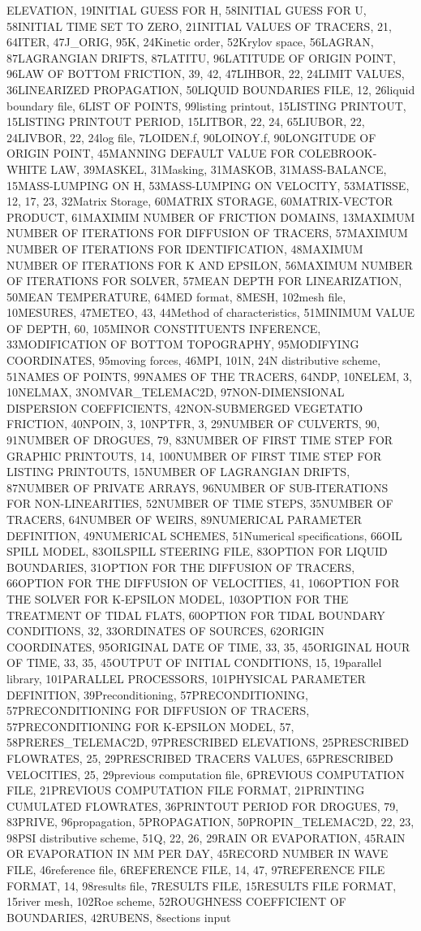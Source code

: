 ELEVATION, 19INITIAL GUESS FOR H, 58INITIAL GUESS FOR U, 58INITIAL TIME SET TO ZERO, 21INITIAL VALUES OF TRACERS, 21, 64ITER, 47J\_ORIG, 95K, 24Kinetic order, 52Krylov space, 56LAGRAN, 87LAGRANGIAN DRIFTS, 87LATITU, 96LATITUDE OF ORIGIN POINT, 96LAW OF BOTTOM FRICTION, 39, 42, 47LIHBOR, 22, 24LIMIT VALUES, 36LINEARIZED PROPAGATION, 50LIQUID BOUNDARIES FILE, 12, 26liquid boundary file, 6LIST OF POINTS, 99listing printout, 15LISTING PRINTOUT, 15LISTING PRINTOUT PERIOD, 15LITBOR, 22, 24, 65LIUBOR, 22, 24LIVBOR, 22, 24log file, 7LOIDEN.f, 90LOINOY.f, 90LONGITUDE OF ORIGIN POINT, 45MANNING DEFAULT VALUE FOR COLEBROOK-WHITE LAW, 39MASKEL, 31Masking, 31MASKOB, 31MASS-BALANCE, 15MASS-LUMPING ON H, 53MASS-LUMPING ON VELOCITY, 53MATISSE, 12, 17, 23, 32Matrix Storage, 60MATRIX STORAGE, 60MATRIX-VECTOR PRODUCT, 61MAXIMIM NUMBER OF FRICTION DOMAINS, 13MAXIMUM NUMBER OF ITERATIONS FOR DIFFUSION OF TRACERS, 57MAXIMUM NUMBER OF ITERATIONS FOR IDENTIFICATION, 48MAXIMUM NUMBER OF ITERATIONS FOR K AND EPSILON, 56MAXIMUM NUMBER OF ITERATIONS FOR SOLVER, 57MEAN DEPTH FOR LINEARIZATION, 50MEAN TEMPERATURE, 64MED format, 8MESH, 102mesh file, 10MESURES, 47METEO, 43, 44Method of characteristics, 51MINIMUM VALUE OF DEPTH, 60, 105MINOR CONSTITUENTS INFERENCE, 33MODIFICATION OF BOTTOM TOPOGRAPHY, 95MODIFYING COORDINATES, 95moving forces, 46MPI, 101N, 24N distributive scheme, 51NAMES OF POINTS, 99NAMES OF THE TRACERS, 64NDP, 10NELEM, 3, 10NELMAX, 3NOMVAR\_TELEMAC2D, 97NON-DIMENSIONAL DISPERSION COEFFICIENTS, 42NON-SUBMERGED VEGETATIO FRICTION, 40NPOIN, 3, 10NPTFR, 3, 29NUMBER OF CULVERTS, 90, 91NUMBER OF DROGUES, 79, 83NUMBER OF FIRST TIME STEP FOR GRAPHIC PRINTOUTS, 14, 100NUMBER OF FIRST TIME STEP FOR LISTING PRINTOUTS, 15NUMBER OF LAGRANGIAN DRIFTS, 87NUMBER OF PRIVATE ARRAYS, 96NUMBER OF SUB-ITERATIONS FOR NON-LINEARITIES, 52NUMBER OF TIME STEPS, 35NUMBER OF TRACERS, 64NUMBER OF WEIRS, 89NUMERICAL PARAMETER DEFINITION, 49NUMERICAL SCHEMES, 51Numerical specifications, 66OIL SPILL MODEL, 83OILSPILL STEERING FILE, 83OPTION FOR LIQUID BOUNDARIES, 31OPTION FOR THE DIFFUSION OF TRACERS, 66OPTION FOR THE DIFFUSION OF VELOCITIES, 41, 106OPTION FOR THE SOLVER FOR K-EPSILON MODEL, 103OPTION FOR THE TREATMENT OF TIDAL FLATS, 60OPTION FOR TIDAL BOUNDARY CONDITIONS, 32, 33ORDINATES OF SOURCES, 62ORIGIN COORDINATES, 95ORIGINAL DATE OF TIME, 33, 35, 45ORIGINAL HOUR OF TIME, 33, 35, 45OUTPUT OF INITIAL CONDITIONS, 15, 19parallel library, 101PARALLEL PROCESSORS, 101PHYSICAL PARAMETER DEFINITION, 39Preconditioning, 57PRECONDITIONING, 57PRECONDITIONING FOR DIFFUSION OF TRACERS, 57PRECONDITIONING FOR K-EPSILON MODEL, 57, 58PRERES\_TELEMAC2D, 97PRESCRIBED ELEVATIONS, 25PRESCRIBED FLOWRATES, 25, 29PRESCRIBED TRACERS VALUES, 65PRESCRIBED VELOCITIES, 25, 29previous computation file, 6PREVIOUS COMPUTATION FILE, 21PREVIOUS COMPUTATION FILE FORMAT, 21PRINTING CUMULATED FLOWRATES, 36PRINTOUT PERIOD FOR DROGUES, 79, 83PRIVE, 96propagation, 5PROPAGATION, 50PROPIN\_TELEMAC2D, 22, 23, 98PSI distributive scheme, 51Q, 22, 26, 29RAIN OR EVAPORATION, 45RAIN OR EVAPORATION IN MM PER DAY, 45RECORD NUMBER IN WAVE FILE, 46reference file, 6REFERENCE FILE, 14, 47, 97REFERENCE FILE FORMAT, 14, 98results file, 7RESULTS FILE, 15RESULTS FILE FORMAT, 15river mesh, 102Roe scheme, 52ROUGHNESS COEFFICIENT OF BOUNDARIES, 42RUBENS, 8sections input 